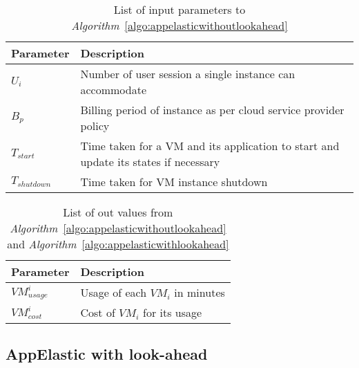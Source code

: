 \begin{center}
  \begin{table}
    \begin{tabular}{ | L{6cm} | L{6cm} |}
      \hline
      Parameter & Description \\ \hline
      \( U_{i} \) & Number of user session a single instance can accommodate  \\ \hline
      \( B_{p} \) & Billing period of instance as per cloud service provider policy \\ \hline
      \( T_{start} \) & Time taken for a VM and its application to start  and update its states if necessary  \\ \hline
      \( T_{shutdown} \) & Time taken for VM instance shutdown\\ \hline
    \end{tabular}
    \caption{List of input parameters to \textit{Algorithm}~\ref{algo:appelasticwithoutlookahead}}
     \label{table:paratable}
\end{table}
\end{center}

\begin{center}
  \begin{table}
    \begin{tabular}{ | L{6cm} | L{6cm} |}
      \hline
      Parameter & Description \\ \hline
      $VM_{usage}^{i}$ & Usage of each $VM_{i}$ in minutes  \\ \hline
      $VM_{cost}^{i}$ & Cost of $VM_{i}$ for its usage \\ \hline
    \end{tabular}
    \caption{List of out values from \textit{Algorithm}~\ref{algo:appelasticwithoutlookahead} and \textit{Algorithm}~\ref{algo:appelasticwithlookahead}}
     \label{table:outputtable}
\end{table}
\end{center}


\subsection{AppElastic with look-ahead}
\label{sub:AppElastic with look-ahead}
